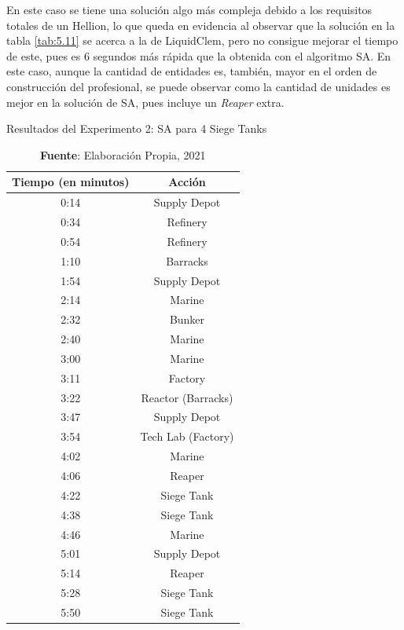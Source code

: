 En este caso se tiene una solución algo más compleja debido a los requisitos totales de un Hellion, lo que queda en evidencia al observar que la solución en la tabla \ref{tab:5.11} se acerca a la de LiquidClem, pero no consigue mejorar el tiempo de este, pues es 6 segundos más rápida que la obtenida con el algoritmo SA. En este caso, aunque la cantidad de entidades es, también, mayor en el orden de construcción del profesional, se puede observar como la cantidad de unidades es mejor en la solución de SA, pues incluye un \textit{Reaper} extra.

\begin{table}[H]
\centering
\def\arraystretch{1.2}
\captionsetup{justification=centering}
\caption{Resultados del Experimento 2: SA para 4 Siege Tanks}
\label{tab:5.3}
\begin{tabular}{|c|c|}
\hline
\textbf{Tiempo (en minutos)} & \textbf{Acción} \\
\hline
0:14 & Supply Depot \\ 
0:34 & Refinery \\ 
0:54 & Refinery \\ 
1:10 & Barracks \\ 
1:54 & Supply Depot \\ 
2:14 & Marine \\
2:32 & Bunker \\
2:40 & Marine \\ 
3:00 & Marine \\ 
3:11 & Factory \\ 
3:22 & Reactor (Barracks) \\ 
3:47 & Supply Depot \\ 
3:54 & Tech Lab (Factory) \\ 
4:02 & Marine \\ 
4:06 & Reaper \\ 
4:22 & Siege Tank \\ 
4:38 & Siege Tank \\ 
4:46 & Marine \\ 
5:01 & Supply Depot \\ 
5:14 & Reaper \\ 
5:28 & Siege Tank \\ 
5:50 & Siege Tank \\ \hline
\end{tabular}
\caption*{\textbf{Fuente}: Elaboración Propia, 2021}
\end{table}

